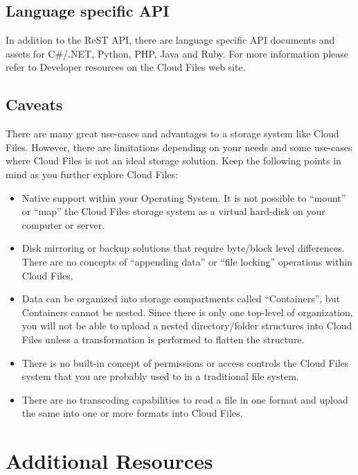 \documentclass[letterpaper,10pt,english]{manual}
\begin{document}
\section{Language specific API}

In addition to the ReST API, there are language specific API documents and
assets for C\#/.NET, Python, PHP, Java and Ruby. For more information please
refer to Developer resources on the Cloud Files web site.


\section{Caveats}

There are many great use-cases and advantages to a storage system like
Cloud Files.  However, there are limitations depending on your needs and
some use-cases where Cloud Files is not an ideal storage solution.  Keep
the following points in mind as you further explore Cloud Files:
\begin{itemize}
\item {} 
Native support within your Operating System. It is not possible to
``mount'' or ``map'' the Cloud Files storage system as a virtual hard-disk
on your computer or server.

\item {} 
Disk mirroring or backup solutions that require byte/block level
differences. There are no concepts of ``appending data'' or ``file locking''
operations within Cloud Files.

\item {} 
Data can be organized into storage compartments called ``Containers'',
but Containers cannot be nested. Since there is only one top-level of
organization, you will not be able to upload a nested directory/folder
structures into Cloud Files unless a transformation is performed to
flatten the structure.

\item {} 
There is no built-in concept of permissions or access controls the Cloud
Files system that you are probably used to in a traditional file system.

\item {} 
There are no transcoding capabilities to read a file in one format and
upload the same into one or more formats into Cloud Files.

\end{itemize}


\chapter{Additional Resources}
\end{document}

